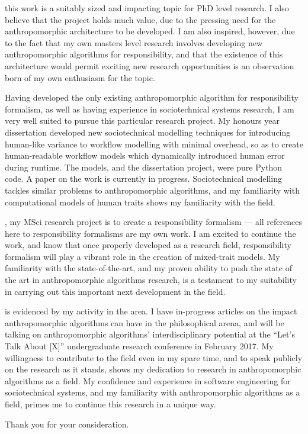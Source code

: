 \bigskip %

 this work is a suitably sized and impacting topic for PhD level research. I also believe that the project holds much value, due to the pressing need for the anthropomorphic architecture to be developed. I am also inspired, however, due to the fact that my own masters level research involves developing new anthropomorphic algorithms for responsibility, and that the existence of this architecture would permit exciting new research opportunities is an observation born of my own enthusiasm for the topic. \par

Having developed the only existing anthropomorphic algorithm for responsibility formalism, as well as having experience in sociotechnical systems research, I am very well suited to pursue this particular research project. My honours year dissertation developed new sociotechnical modelling techniques for introducing human-like variance to workflow modelling with minimal overhead, so as to create human-readable workflow models which dynamically introduced human error during runtime. The models, and the dissertation project, were pure Python code. A paper on the work is currently in progress.\cite{wallis_2016_b} Sociotechnical modelling tackles similar problems to anthropomorphic algorithms, and my familiarity with computational models of human traits shows my familiarity with the field.\par

, my MSci research project is to create a responsibility formalism --- all references here to responsibility formalisms are my own work. I am excited to continue the work, and know that once properly developed as a research field, responsibility formalism will play a vibrant role in the creation of mixed-trait models. My familiarity with the state-of-the-art, and my proven ability to push the state of the art in anthropomorphic algorithms research, is a testament to my suitability in carrying out this important next development in the field.\par

 is evidenced by my activity in the area. I have in-progress articles on the impact anthropomorphic algorithms can have in the philosophical arena, and will be talking on anthropomorphic algorithms' interdisciplinary potential at the ``Let's Talk About [X]'' undergraduate research conference in February 2017. My willingness to contribute to the field even in my spare time, and to speak publicly on the research as it stands, shows my dedication to research in anthropomorphic algorithms as a field. My confidence and experience in software engineering for sociotechnical systems, and my familiarity with anthropomorphic algorithms as a field, primes me to continue this research in a unique way.\par

\bigskip

Thank you for your consideration.\par





